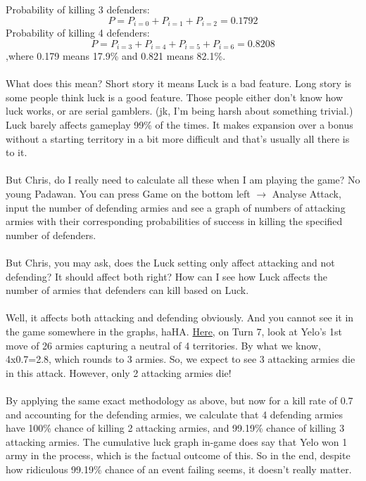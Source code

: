 Probability of killing 3 defenders: 
$$P=P_{i=0}+P_{i=1}+P_{i=2} = 0.1792$$
Probability of killing 4 defenders:
$$P=P_{i=3}+P_{i=4}+P_{i=5}+P_{i=6} = 0.8208$$
,where 0.179 means 17.9\% and 0.821 means 82.1\%.
\\
\\
What does this mean? Short story it means Luck is a bad feature. Long story is some people think luck is a good feature. Those people either don't know how luck works, or are serial gamblers. (jk, I'm being harsh about something trivial.) Luck barely affects gameplay 99\% of the times. It makes expansion over a bonus without a starting territory in a bit more difficult and that's usually all there is to it.
\\
\\
But Chris, do I really need to calculate all these when I am playing the game? No young Padawan. You can press Game on the bottom left $\rightarrow$ Analyse Attack, input the number of defending armies and see a graph of numbers of attacking armies with their corresponding probabilities of success in killing the specified number of defenders.
\\
\\
But Chris, you may ask, does the Luck setting only affect attacking and not defending? It should affect both right? How can I see how Luck affects the number of armies that defenders can kill based on Luck. 
\\
\\
Well, it affects both attacking and defending obviously. And you cannot see it in the game somewhere in the graphs, haHA. \href{https://www.warzone.com/MultiPlayer?GameID=35445501}{Here,} on Turn 7, look at Yelo's 1st move of 26 armies capturing a neutral of 4 territories. By what we know, 4x0.7=2.8, which rounds to 3 armies. So, we expect to see 3 attacking armies die in this attack. However, only 2 attacking armies die! 
\\
\\
By applying the same exact methodology as above, but now for a kill rate of 0.7 and accounting for the defending armies, we calculate that 4 defending armies have 100\% chance of killing 2 attacking armies, and 99.19\% chance of killing 3 attacking armies. The cumulative luck graph in-game does say that Yelo won 1 army in the process, which is the factual outcome of this. So in the end, despite how ridiculous 99.19\% chance of an event failing seems, it doesn't really matter.

